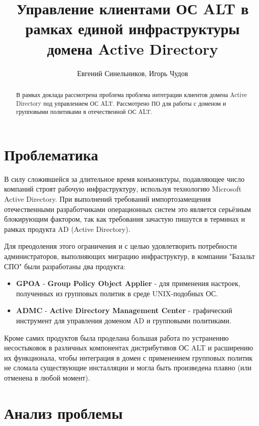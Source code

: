 \author{Евгений Синельников, Игорь Чудов}
\title{Управление клиентами ОС ALT в рамках единой инфраструктуры
домена Active Directory}
\maketitle

\begin{abstract}
  В рамках доклада рассмотрена проблема проблема интеграции клиентов
  домена Active Directory под управлением ОС ALT. Рассмотрено ПО для
  работы с доменом и групповыми политиками в отечественной ОС ALT.
\end{abstract}


\section{Проблематика}

В силу сложившейся за длительное время конъюнктуры, подавляющее число компаний
строят рабочую инфраструктуру, используя технологию Microsoft Active
Directory. При выполнений требований импортозамещения отечественными
разработчиками операционных систем это является серьёзным блокирующим
фактором, так как требования зачастую пишутся в терминах и рамках
продукта AD (Active Directory).

Для преодоления этого ограничения и с целью удовлетворить потребности
администраторов, выполняющих миграцию инфраструктур, в компании
"Базальт СПО" были разработаны два продукта:

\begin{itemize}
\item \textbf{GPOA} - \textbf{Group Policy Object Applier} - для применения
настроек, полученных из групповых политик в среде UNIX-подобных ОС.
\item \textbf{ADMC} - \textbf{Active Directory Management Center} -
графический инструмент для управления доменом AD и групповыми политиками.
\end{itemize}

Кроме самих продуктов была проделана большая работа по устранению
несостыковок в различных компонентах дистрибутивов ОС ALT и расширению
их функционала, чтобы интеграция в домен с применением групповых
политик не сломала существующие инсталляции и могла быть произведена
плавно (или отменена в любой момент).

\section{Анализ проблемы}

